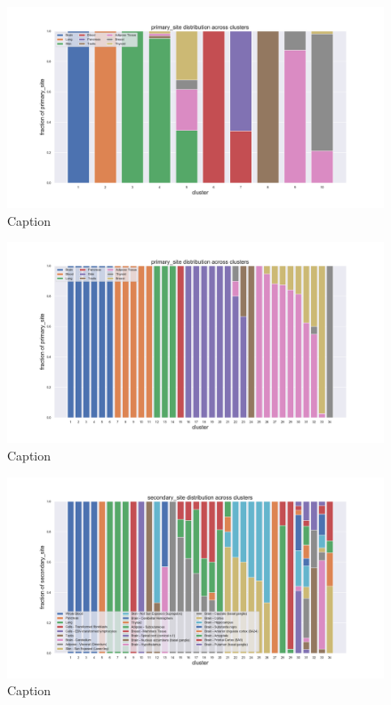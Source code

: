 \begin{figure}[htb!]
    \centering
    \includegraphics[width=0.9\linewidth]{pictures/topic/gtex/oversigma_10tissue/fraction_clustercomposition_l3_primary_site.pdf}
    \caption{Caption}
    \label{fig:topic/gtex/oversigma_10tissue/fraction_clustercomposition_l2_primary_site}
\end{figure}

\begin{figure}[htb!]
    \centering
    \includegraphics[width=0.9\linewidth]{pictures/topic/gtex/oversigma_10tissue/fraction_clustercomposition_l2_primary_site.pdf}
    \caption{Caption}
    \label{fig:topic/gtex/oversigma_10tissue/fraction_clustercomposition_l2_primary_site}
\end{figure}

\begin{figure}[htb!]
    \centering
    \includegraphics[width=0.9\linewidth]{pictures/topic/gtex/oversigma_10tissue/fraction_clustercomposition_l2_secondary_site.pdf}
    \caption{Caption}
    \label{fig:topic/gtex/oversigma_10tissue/fraction_clustercomposition_l2_secondary_site}
\end{figure}


